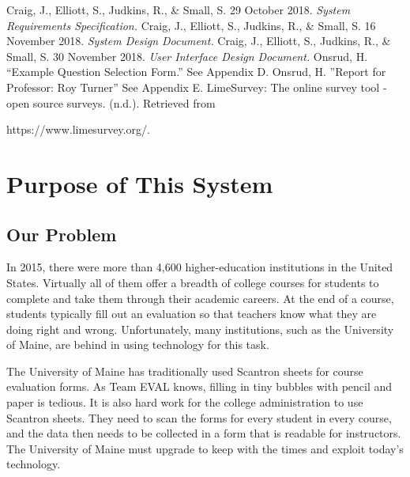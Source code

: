 \documentclass{article}
\begin{document}
Craig, J., Elliott, S., Judkins, R., \& Small, S. 29 October 2018. \textit{System Requirements Specification.}
\vspace{3mm}\newline
Craig, J., Elliott, S., Judkins, R., \& Small, S. 16 November 2018. \textit{System Design Document.}
\vspace{3mm}\newline
Craig, J., Elliott, S., Judkins, R., \& Small, S. 30 November 2018. \textit{User Interface Design Document.}
\vspace{3mm}\newline
Onsrud, H. ``Example Question Selection Form.'' See Appendix D.
\vspace{3mm}\newline
Onsrud, H. ''Report for Professor: Roy Turner'' See Appendix E.
\vspace{3mm}\newline
LimeSurvey: The online survey tool - open source surveys. (n.d.). Retrieved from

https://www.limesurvey.org/.

\section{Purpose of This System}

\subsection{Our Problem}

In 2015, there were more than 4,600 higher-education institutions in the United States. Virtually all of them offer a breadth of college courses for students to complete and take them through their academic careers. At the end of a course, students typically fill out an evaluation so that teachers know what they are doing right and wrong. Unfortunately, many institutions, such as the University of Maine, are behind in using technology for this task.

The University of Maine has traditionally used Scantron sheets for course evaluation forms. As Team EVAL knows, filling in tiny bubbles with pencil and paper is tedious. It is also hard work for the college administration to use Scantron sheets. They need to scan the forms for every student in every course, and the data then needs to be collected in a form that is readable for instructors. The University of Maine must upgrade to keep with the times and exploit today's technology.
\end{document}
